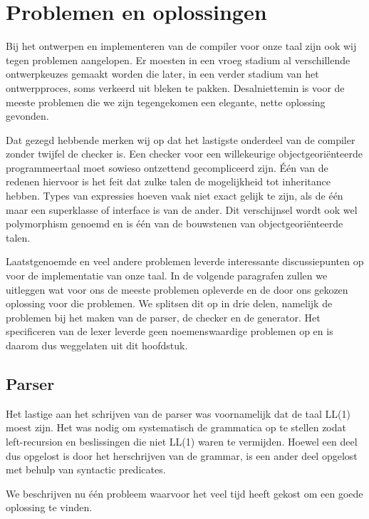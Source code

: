 \section{Problemen en oplossingen}
Bij het ontwerpen en implementeren van de compiler voor onze taal zijn ook wij tegen problemen aangelopen. Er moesten in een vroeg stadium al verschillende ontwerpkeuzes gemaakt worden die later, in een verder stadium van het ontwerpproces, soms verkeerd uit bleken te pakken. Desalniettemin is voor de meeste problemen die we zijn tegengekomen een elegante, nette oplossing gevonden.

Dat gezegd hebbende merken wij op dat het lastigste onderdeel van de compiler zonder twijfel de checker is. Een checker voor een willekeurige objectgeori\"enteerde programmeertaal moet sowieso ontzettend gecompliceerd zijn. \'E\'en van de redenen hiervoor is het feit dat zulke talen de mogelijkheid tot inheritance hebben. Types van expressies hoeven vaak niet exact gelijk te zijn, als de \'e\'en maar een superklasse of interface is van de ander. Dit verschijnsel wordt ook wel polymorphism genoemd en is \'e\'en van de bouwstenen van objectgeori\"enteerde talen.

Laatstgenoemde en veel andere problemen leverde interessante discussiepunten op voor de implementatie van onze taal. In de volgende paragrafen zullen we uitleggen wat voor ons de meeste problemen opleverde en de door ons gekozen oplossing voor die problemen. We splitsen dit op in drie delen, namelijk de problemen bij het maken van de parser, de checker en de generator. Het specificeren van de lexer leverde geen noemenswaardige problemen op en is daarom dus weggelaten uit dit hoofdstuk.

\subsection{Parser}
Het lastige aan het schrijven van de parser was voornamelijk dat de taal LL(1) moest zijn. Het was nodig om systematisch de grammatica op te stellen zodat left-recursion en beslissingen die niet LL(1) waren te vermijden. Hoewel een deel dus opgelost is door het herschrijven van de grammar, is een ander deel opgelost met behulp van syntactic predicates.

We beschrijven nu \'e\'en probleem waarvoor het veel tijd heeft gekost om een goede oplossing te vinden.

